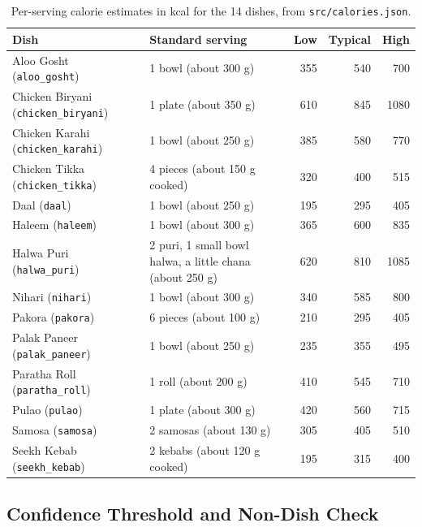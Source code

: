 \begin{table}[H]
  \centering
  \small
  \begin{tabular}{|p{4.3cm}|p{4.8cm}|r|r|r|}
    \hline
    \textbf{Dish} & \textbf{Standard serving} & \textbf{Low} & \textbf{Typical} & \textbf{High} \\
    \hline
    Aloo Gosht (\texttt{aloo\_gosht}) & 1 bowl (about 300 g) & 355 & 540 & 700 \\
    Chicken Biryani (\texttt{chicken\_biryani}) & 1 plate (about 350 g) & 610 & 845 & 1080 \\
    Chicken Karahi (\texttt{chicken\_karahi}) & 1 bowl (about 250 g) & 385 & 580 & 770 \\
    Chicken Tikka (\texttt{chicken\_tikka}) & 4 pieces (about 150 g cooked) & 320 & 400 & 515 \\
    Daal (\texttt{daal}) & 1 bowl (about 250 g) & 195 & 295 & 405 \\
    Haleem (\texttt{haleem}) & 1 bowl (about 300 g) & 365 & 600 & 835 \\
    Halwa Puri (\texttt{halwa\_puri}) & 2 puri, 1 small bowl halwa, a little chana (about 250 g) & 620 & 810 & 1085 \\
    Nihari (\texttt{nihari}) & 1 bowl (about 300 g) & 340 & 585 & 800 \\
    Pakora (\texttt{pakora}) & 6 pieces (about 100 g) & 210 & 295 & 405 \\
    Palak Paneer (\texttt{palak\_paneer}) & 1 bowl (about 250 g) & 235 & 355 & 495 \\
    Paratha Roll (\texttt{paratha\_roll}) & 1 roll (about 200 g) & 410 & 545 & 710 \\
    Pulao (\texttt{pulao}) & 1 plate (about 300 g) & 420 & 560 & 715 \\
    Samosa (\texttt{samosa}) & 2 samosas (about 130 g) & 305 & 405 & 510 \\
    Seekh Kebab (\texttt{seekh\_kebab}) & 2 kebabs (about 120 g cooked) & 195 & 315 & 400 \\
    \hline
  \end{tabular}
  \caption{Per-serving calorie estimates in kcal for the 14 dishes, from \texttt{src/calories.json}.}
  \label{tab:calories}
\end{table}

\subsection{Confidence Threshold and Non-Dish Check}

